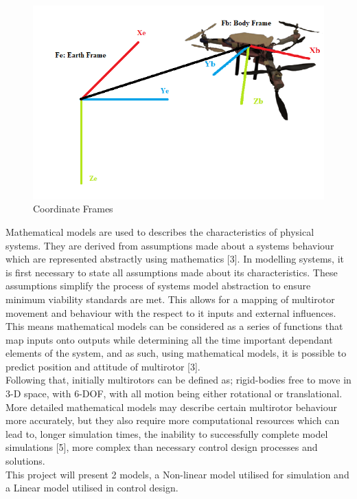 \documentclass[12pt,a4paper,twoside]{report}
\begin{document}
			\newpage
			
			\begin{figure}[h!]
				\centering
				\includegraphics[width=0.8\linewidth]{UAVwithFrames.png}
				\caption{Coordinate Frames}
				\label{fig:Coordinate frames}
			\end{figure}
			
			Mathematical models are used to describes the characteristics of physical systems. They are derived from assumptions made about a systems behaviour which are represented abstractly using mathematics [3]. In modelling systems, it is first necessary to state all assumptions made about its characteristics. These assumptions simplify the process of systems model abstraction to ensure minimum viability standards are met. This allows for a mapping of multirotor movement and behaviour with the respect to it inputs and external influences. This means mathematical models can be considered as a series of functions that map inputs onto outputs while determining all the time important dependant elements of the  system, and as such, using mathematical models, it is possible to predict position and attitude of multirotor [3]. 
			\\
			Following that, initially multirotors can be defined as; rigid-bodies free to move in 3-D space, with 6-DOF, with all motion being either rotational or translational.
			\\
			More detailed mathematical models may describe certain multirotor behaviour more accurately, but they also require more computational resources which can lead to, longer simulation times, the inability to successfully complete model simulations [5], more complex than necessary control design processes and solutions.
			\\
			This project will present 2 models, a Non-linear model utilised for simulation and a Linear model utilised in control design.
			\\
			
\end{document}
